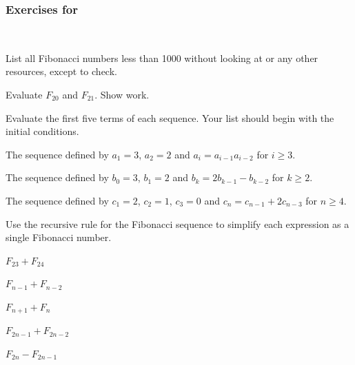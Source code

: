 
\subsubsection*{Exercises for  \subfib}

\begin{exer}[\exerP] %
\label{exer_list_fibs}
~
    \begin{exerpart}
        \item List all Fibonacci numbers less than 1000 without looking at  or any other resources, except to check.
        \item Evaluate $F_{20}$ and $F_{21}$.  Show work.
    \end{exerpart} 
\end{exer} 

\begin{exer}[\exerP] %
\label{exer_eval_terms_higher_order}
    Evaluate the first five terms of each sequence. Your list should begin with the initial conditions.
        \begin{exerpart}
            \item The sequence defined by $a_1=3$, $a_2=2$ and $a_i = a_{i-1}a_{i-2}$ for $i \ge 3$.
            \item The sequence defined by $b_0=3$, $b_1=2$ and $b_k=2b_{k-1}-b_{k-2}$ for $k\ge 2$.
            \item The sequence defined by $c_1=2$, $c_2=1$, $c_3=0$ and $c_n = c_{n-1} + 2c_{n-3}$ for $n \ge 4$.
        \end{exerpart}
\end{exer}

\begin{exer}[\exerU] %
\label{exer_write_single_fib}
    Use the recursive rule for the Fibonacci sequence to simplify each expression as a single Fibonacci number.
        \begin{exerpart}
            \item $F_{23}+F_{24}$
            \item $F_{n-1}+F_{n-2}$
            \item $F_{n+1}+F_n$
            \item $F_{2n-1}+F_{2n-2}$
            \item $F_{2n}-F_{2n-1}$
        \end{exerpart}    
\end{exer}

